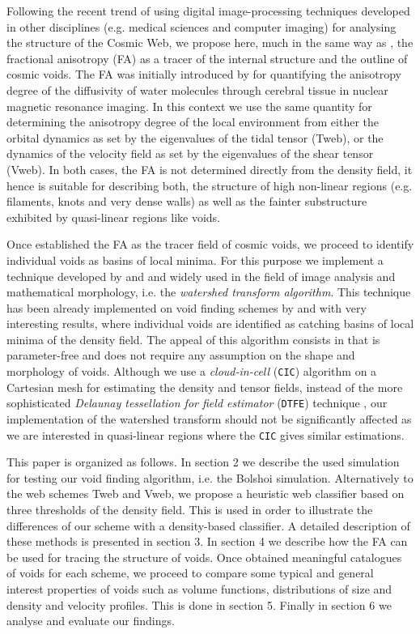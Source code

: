 \documentclass[a4,useAMS,usenatbib,usegraphicx]{latex/mn2e}
\begin{document}
Following the recent trend of using digital image-processing techniques 
developed in other disciplines (e.g. medical sciences and computer imaging) 
for analysing the structure of the Cosmic Web, we propose here, much in 
the same way as \citet{Libeskind13}, the fractional anisotropy (FA) as a 
tracer of the internal structure and the outline of cosmic voids. The FA 
was initially introduced by \citet{Basser95} for quantifying the 
anisotropy degree of the diffusivity of water molecules through cerebral
tissue in nuclear magnetic resonance imaging. In this context we use the 
same quantity for determining the anisotropy degree of the local 
environment from either the orbital dynamics as set by the eigenvalues of
the tidal tensor (Tweb), or the dynamics of the velocity field as set by 
the eigenvalues of the shear tensor (Vweb). In both cases, the FA is not
determined directly from the density field, it hence is suitable for 
describing both, the structure of high non-linear regions (e.g. filaments,
knots and very dense walls) as well as the fainter substructure exhibited 
by quasi-linear regions like voids.


Once established the FA as the tracer field of cosmic voids, we proceed to
identify individual voids as basins of local minima. For this purpose we
implement a technique developed by \citet{Beucher79} and \citet{Beucher93} 
and widely used in the field of image analysis and mathematical morphology, 
i.e. the \textit{watershed transform algorithm}. This technique has been 
already implemented on void finding schemes by \citet{Platen07} and 
\citet{Neyrinck08} with very interesting results, where individual voids 
are identified as catching basins of local minima of the density field. 
The appeal of this algorithm consists in that is parameter-free and does 
not require any assumption on the shape and morphology of voids. 
Although we use a \textit{cloud-in-cell} (\texttt{CIC}) algorithm on a 
Cartesian mesh for estimating the density and tensor fields, instead of 
the more sophisticated \textit{Delaunay tessellation for field estimator} 
(\texttt{DTFE}) technique \citep{Schaap00}, our implementation of the 
watershed transform should not be significantly affected as we are 
interested in quasi-linear regions where the \texttt{CIC} gives similar 
estimations.


This paper is organized as follows. In section 2 we describe the used
simulation for testing our void finding algorithm, i.e. the Bolshoi
simulation. Alternatively to the web schemes Tweb and Vweb, we propose 
a heuristic web classifier based on three thresholds of the density field. 
This is used in order to illustrate the differences of our scheme with a
density-based classifier. A detailed description of these methods is 
presented in section 3. In section 4 we describe how the FA can be used 
for tracing the structure of voids. Once obtained meaningful catalogues 
of voids for each scheme, we proceed to compare some typical and general 
interest properties of voids such as volume functions, distributions of 
size and density and velocity profiles. This is done in section 5. Finally 
in section 6 we analyse and evaluate our findings.
\end{document}
